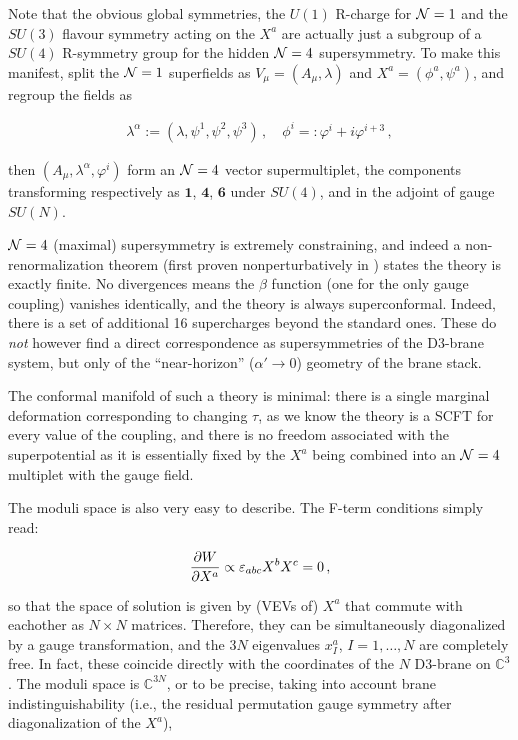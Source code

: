 Note that the obvious global symmetries, the $U(1)$ R-charge for $\mathcal{N} = 1$ and the $SU(3)$ flavour symmetry acting on the $X^a$ are actually just a subgroup of a $SU(4)$ R-symmetry group for the hidden $\mathcal{N} = 4$ supersymmetry. To make this manifest, split the $\mathcal{N}=1$ superfields as $V_\mu = (A_\mu,\lambda)$ and $X^a = (\phi^a,\psi^a)$, and regroup the fields as

\begin{align}
	\lambda^\alpha := (\lambda,\psi^1,\psi^2,\psi^3)\,,\quad \phi^i =: \varphi^i + i \varphi^{i+3}\,,
	\label{}
\end{align}

then $(A_\mu,\lambda^\alpha,\varphi^i)$ form an $\mathcal{N}=4$ vector supermultiplet, the components transforming respectively as $\mathbf{1}$, $\mathbf{4}$, $\mathbf{6}$ under $SU(4)$, and in the adjoint of gauge $SU(N)$.

$\mathcal{N} = 4$ (maximal) supersymmetry is extremely constraining, and indeed a non-renormalization theorem (first proven nonperturbatively in \cite{seibergnr}) states the theory is exactly finite. No divergences means the $\beta$ function (one for the only gauge coupling) vanishes identically, and the theory is always superconformal. Indeed, there is a set of additional 16 supercharges beyond the standard ones. These do \emph{not} however find a direct correspondence as supersymmetries of the D3-brane system, but only of the ``near-horizon'' ($\alpha' \rightarrow 0$) geometry of the brane stack.

The conformal manifold of such a theory is minimal: there is a single marginal deformation corresponding to changing $\tau$, as we know the theory is a SCFT for every value of the coupling, and there is no freedom associated with the superpotential as it is essentially fixed by the $X^a$ being combined into an $\mathcal{N} = 4$ multiplet with the gauge field.

The moduli space is also very easy to describe. The F-term conditions simply read:

\begin{equation}
	\frac{\partial W}{\partial X^a} \propto \varepsilon_{abc} X^b X^c = 0\,,
	\label{}
\end{equation}

so that the space of solution is given by (VEVs of) $X^a$ that commute with eachother as $N\times N$ matrices. Therefore, they can be simultaneously diagonalized by a gauge transformation, and the $3N$ eigenvalues $x^a_I$, $I=1,\ldots,N$ are completely free. In fact, these coincide directly with the coordinates of the $N$ D3-brane on $\mathbb{C}^3$. The moduli space is $\mathbb{C}^{3N}$, or to be precise, taking into account brane indistinguishability (i.e., the residual permutation gauge symmetry after diagonalization of the $X^a$),

